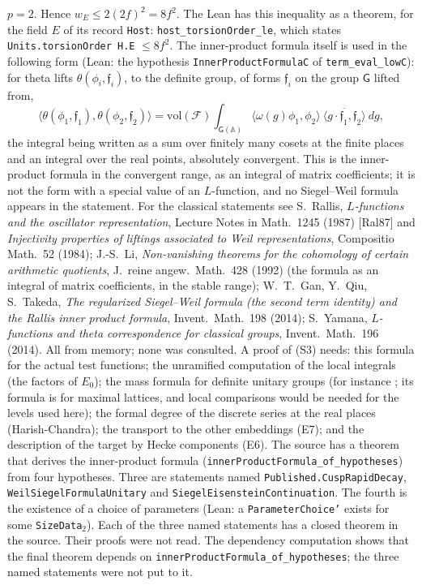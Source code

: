 \documentclass[11pt,letterpaper]{article}
\begin{document}
$p=2$. Hence $w_E\le2(2f)^2=8f^2$. The Lean has this inequality as a theorem, for the field $E$ of its
record \texttt{Host}: \texttt{host\_torsionOrder\_le}, which states
\texttt{Units.torsionOrder H.E} $\le8f^2$. The inner-product
formula itself is used in the following form (Lean: the hypothesis \texttt{InnerProductFormulaC} of
\texttt{term\_eval\_lowC}): for theta lifts $\theta(\phi_i,\mathfrak f_i)$, to the definite group, of
forms $\mathfrak f_i$ on the group $\mathsf G$ lifted from,
\begin{equation}\label{D:293}
 \big\langle\theta(\phi_1,\mathfrak f_1),\theta(\phi_2,\mathfrak f_2)\big\rangle
 =\mathrm{vol}(\mathcal F)\int_{\mathsf G(\mathbb A)}
 \langle\omega(g)\phi_1,\phi_2\rangle\ \overline{\langle g\cdot\mathfrak f_1,\mathfrak f_2\rangle}\ dg ,
\end{equation}
the integral being written as a sum over finitely many cosets at the finite places and an integral over
the real points, absolutely convergent. This is the inner-product formula in the convergent range, as an
integral of matrix coefficients; it is not the form with a special value of an $L$-function, and no
Siegel--Weil formula appears in the statement. For the classical statements see S.~Rallis,
\emph{$L$-functions and the oscillator representation}, Lecture Notes in Math.~1245 (1987) [Ral87] and
\emph{Injectivity properties of liftings associated to Weil representations}, Compositio Math.~52 (1984);
J.-S.~Li, \emph{Non-vanishing theorems for the cohomology of certain arithmetic quotients}, J.~reine
angew.~Math.~428 (1992) (the formula as an integral of matrix coefficients, in the stable range);
W.~T.~Gan, Y.~Qiu, S.~Takeda, \emph{The regularized Siegel--Weil formula (the second term identity) and
the Rallis inner product formula}, Invent.~Math.~198 (2014); S.~Yamana, \emph{$L$-functions and theta
correspondence for classical groups}, Invent.~Math.~196 (2014). All from memory; none was consulted. A
proof of (S3) needs: this formula for the actual test functions; the unramified computation of the local
integrals (the factors of $E_0$); the mass formula for definite unitary groups (for instance \cite{GHY01}; its formula is for maximal lattices, and local comparisons would be needed for the levels used here); the formal degree of the discrete series at the real places (Harish-Chandra); the transport to
the other embeddings (E7); and the description of the target by Hecke components (E6). The source has a
theorem that derives the inner-product formula (\texttt{innerProductFormula\_of\_hypotheses}) from four
hypotheses. Three are statements named \texttt{Published.CuspRapidDecay},
\texttt{WeilSiegelFormulaUnitary} and \texttt{SiegelEisensteinContinuation}. The fourth is the existence
of a choice of parameters (Lean: a \texttt{ParameterChoice'} exists for some \texttt{SizeData}$_2$). Each of
the three named statements has a closed theorem in the source. Their proofs
were not read. The dependency computation shows that the final theorem depends on \texttt{innerProductFormula\_of\_hypotheses}; the three named statements were not put to it.
\end{document}
